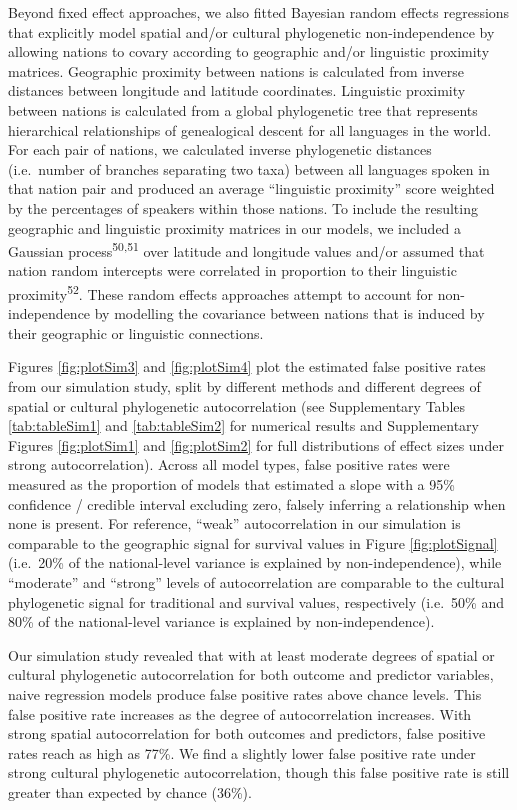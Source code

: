 \documentclass[
  man,floatsintext]{apa6}
\begin{document}
Beyond fixed effect approaches, we also fitted Bayesian random effects regressions that explicitly model spatial and/or cultural phylogenetic non-independence by allowing nations to covary according to geographic and/or linguistic proximity matrices. Geographic proximity between nations is calculated from inverse distances between longitude and latitude coordinates. Linguistic proximity between nations is calculated from a global phylogenetic tree that represents hierarchical relationships of genealogical descent for all languages in the world. For each pair of nations, we calculated inverse phylogenetic distances (i.e.~number of branches separating two taxa) between all languages spoken in that nation pair and produced an average ``linguistic proximity'' score weighted by the percentages of speakers within those nations. To include the resulting geographic and linguistic proximity matrices in our models, we included a Gaussian process\textsuperscript{50,51} over latitude and longitude values and/or assumed that nation random intercepts were correlated in proportion to their linguistic proximity\textsuperscript{52}. These random effects approaches attempt to account for non-independence by modelling the covariance between nations that is induced by their geographic or linguistic connections.

Figures \ref{fig:plotSim3} and \ref{fig:plotSim4} plot the estimated false positive rates from our simulation study, split by different methods and different degrees of spatial or cultural phylogenetic autocorrelation (see Supplementary Tables \ref{tab:tableSim1} and \ref{tab:tableSim2} for numerical results and Supplementary Figures \ref{fig:plotSim1} and \ref{fig:plotSim2} for full distributions of effect sizes under strong autocorrelation). Across all model types, false positive rates were measured as the proportion of models that estimated a slope with a 95\% confidence / credible interval excluding zero, falsely inferring a relationship when none is present. For reference, ``weak'' autocorrelation in our simulation is comparable to the geographic signal for survival values in Figure \ref{fig:plotSignal} (i.e.~20\% of the national-level variance is explained by non-independence), while ``moderate'' and ``strong'' levels of autocorrelation are comparable to the cultural phylogenetic signal for traditional and survival values, respectively (i.e.~50\% and 80\% of the national-level variance is explained by non-independence).

Our simulation study revealed that with at least moderate degrees of spatial or cultural phylogenetic autocorrelation for both outcome and predictor variables, naive regression models produce false positive rates above chance levels. This false positive rate increases as the degree of autocorrelation increases. With strong spatial autocorrelation for both outcomes and predictors, false positive rates reach as high as 77\%. We find a slightly lower false positive rate under strong cultural phylogenetic autocorrelation, though this false positive rate is still greater than expected by chance (36\%).
\end{document}
